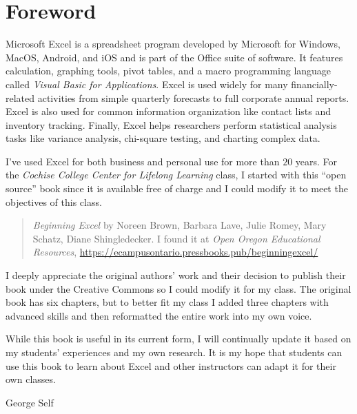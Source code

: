 \chapter*{Foreword}\label{ch:foreword}

Microsoft Excel is a spreadsheet program developed by Microsoft for Windows, MacOS, Android, and iOS and is part of the Office suite of software. It features calculation, graphing tools, pivot tables, and a macro programming language called \textit{Visual Basic for Applications}. Excel is used widely for many financially-related activities from simple quarterly forecasts to full corporate annual reports. Excel is also used for common information organization like contact lists and inventory tracking. Finally, Excel helps researchers perform statistical analysis tasks like variance analysis, chi-square testing, and charting complex data.

I've used Excel for both business and personal use for more than $ 20 $ years. For the \textit{Cochise College Center for Lifelong Learning} class, I started with this ``open source'' book since it is available free of charge and I could modify it to meet the objectives of this class.

\begin{quote}
	\textit{Beginning Excel} by Noreen Brown, Barbara Lave, Julie Romey, Mary Schatz, Diane Shingledecker. I found it at \textit{Open Oregon Educational Resources}, \url{https://ecampusontario.pressbooks.pub/beginningexcel/}
\end{quote}

I deeply appreciate the original authors' work and their decision to publish their book under the Creative Commons so I could modify it for my class. The original book has six chapters, but to better fit my class I added three chapters with advanced skills and then reformatted the entire work into my own voice.

While this book is useful in its current form, I will continually update it based on my students' experiences and my own research. It is my hope that students can use this book to learn about Excel and other instructors can adapt it for their own classes.

\bigskip
\begin{flushright}
  \textemdash \; George Self
\end{flushright}

